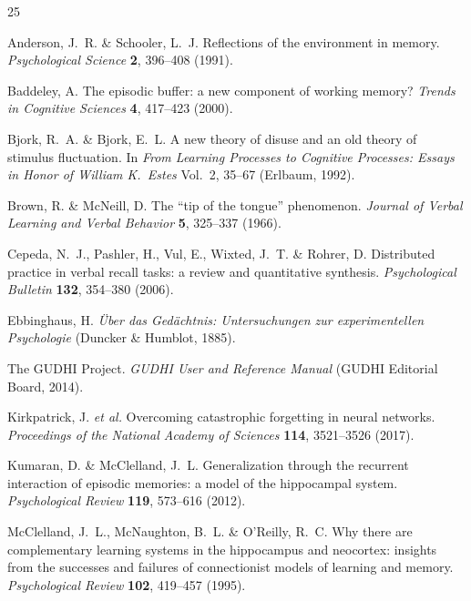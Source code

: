 \documentclass[11pt]{article}
\begin{document}
\begin{thebibliography}{25}

Anderson, J.~R. \& Schooler, L.~J.
\newblock Reflections of the environment in memory.
\newblock \textit{Psychological Science} \textbf{2}, 396--408 (1991).

Baddeley, A.
\newblock The episodic buffer: a new component of working memory?
\newblock \textit{Trends in Cognitive Sciences} \textbf{4}, 417--423 (2000).

Bjork, R.~A. \& Bjork, E.~L.
\newblock A new theory of disuse and an old theory of stimulus fluctuation.
\newblock In \textit{From Learning Processes to Cognitive Processes: Essays in Honor of William K.\ Estes} Vol.~2, 35--67 (Erlbaum, 1992).

Brown, R. \& McNeill, D.
\newblock The ``tip of the tongue'' phenomenon.
\newblock \textit{Journal of Verbal Learning and Verbal Behavior} \textbf{5}, 325--337 (1966).

Cepeda, N.~J., Pashler, H., Vul, E., Wixted, J.~T. \& Rohrer, D.
\newblock Distributed practice in verbal recall tasks: a review and quantitative synthesis.
\newblock \textit{Psychological Bulletin} \textbf{132}, 354--380 (2006).

Ebbinghaus, H.
\newblock \textit{{\"U}ber das Ged{\"a}chtnis: Untersuchungen zur experimentellen Psychologie}
\newblock (Duncker \& Humblot, 1885).

The GUDHI Project.
\newblock \textit{GUDHI User and Reference Manual} (GUDHI Editorial Board, 2014).

Kirkpatrick, J. \textit{et al.}
\newblock Overcoming catastrophic forgetting in neural networks.
\newblock \textit{Proceedings of the National Academy of Sciences} \textbf{114}, 3521--3526 (2017).

Kumaran, D. \& McClelland, J.~L.
\newblock Generalization through the recurrent interaction of episodic memories: a model of the hippocampal system.
\newblock \textit{Psychological Review} \textbf{119}, 573--616 (2012).

McClelland, J.~L., McNaughton, B.~L. \& O'Reilly, R.~C.
\newblock Why there are complementary learning systems in the hippocampus and neocortex: insights from the successes and failures of connectionist models of learning and memory.
\newblock \textit{Psychological Review} \textbf{102}, 419--457 (1995).


\end{thebibliography}
\end{document}
